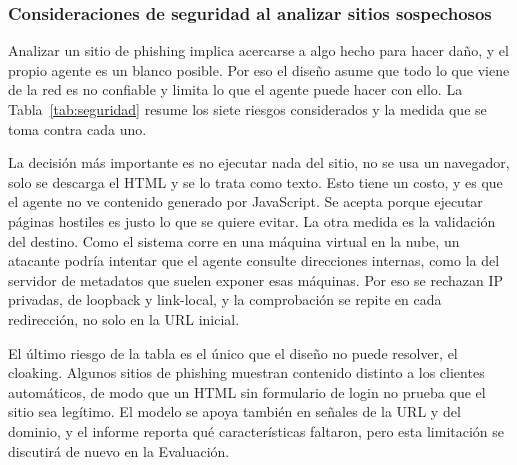 \subsubsection{Consideraciones de seguridad al analizar sitios sospechosos}

Analizar un sitio de phishing implica acercarse a algo hecho para hacer daño, y el propio agente es un blanco posible. Por eso el diseño asume que todo lo que viene de la red es no confiable y limita lo que el agente puede hacer con ello. La Tabla~\ref{tab:seguridad} resume los siete riesgos considerados y la medida que se toma contra cada uno. \newline

La decisión más importante es no ejecutar nada del sitio, no se usa un navegador, solo se descarga el HTML y se lo trata como texto. Esto tiene un costo, y es que el agente no ve contenido generado por JavaScript. Se acepta porque ejecutar páginas hostiles es justo lo que se quiere evitar. La otra medida es la validación del destino. Como el sistema corre en una máquina virtual en la nube, un atacante podría intentar que el agente consulte direcciones internas, como la del servidor de metadatos que suelen exponer esas máquinas. Por eso se rechazan IP privadas, de loopback y link-local, y la comprobación se repite en cada redirección, no solo en la URL inicial. \newline

El último riesgo de la tabla es el único que el diseño no puede resolver, el cloaking. Algunos sitios de phishing muestran contenido distinto a los clientes automáticos, de modo que un HTML sin formulario de login no prueba que el sitio sea legítimo. El modelo se apoya también en señales de la URL y del dominio, y el informe reporta qué características faltaron, pero esta limitación se discutirá de nuevo en la Evaluación.\newline

